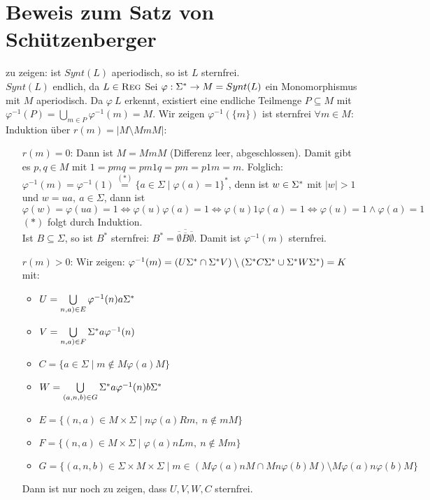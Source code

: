 \section{Beweis zum Satz von Schützenberger}
    zu zeigen: ist $Synt(L)$ aperiodisch, so ist $L$ sternfrei.\\
    $Synt(L)$ endlich, da $L\in \textsc{Reg}$
    Sei $\varphi:\Sigma^*\rightarrow M=Synt(L)$ ein Monomorphismus mit $M$ aperiodisch. Da $\varphi\ L$ erkennt, existiert eine endliche Teilmenge $P\subseteq M$ mit $\varphi^{-1}(P)=\bigcup\limits_{m\in P}\varphi^{-1}(m)=M$. Wir zeigen $\varphi^{-1}(\{m\})$ ist sternfrei $\forall m\in M$:\\
    Induktion über $r(m)=|M\setminus MmM|$:
    \begin{itemize}
        \item[$r(m)=0$:] Dann ist $M=MmM$ (Differenz leer, abgeschlossen). Damit gibt es $p,q\in M$ mit $1=pmq=pm1q=pm=p1m=m$. Folglich: $\varphi^{-1}(m)=\varphi^{-1}(1)\overset{(*)}{=}\{a\in\Sigma\mid\varphi(a)=1\}^*$, denn ist $w\in \Sigma^*$ mit $|w|>1$ und $w=ua,\ a\in \Sigma$, dann ist $$\varphi(w)=\varphi(ua)=1\Leftrightarrow \varphi(u)\varphi(a)=1\Leftrightarrow \varphi(u)1\varphi(a)=1\Leftrightarrow \varphi(u)=1\wedge \varphi(a)=1$$
        $(*)$ folgt durch Induktion.\\
        Ist $B\subseteq \Sigma$, so ist $B^*$ sternfrei: $B^*=\overline{\overline{\emptyset}\overline{B}\overline{\emptyset}}$. Damit ist $\varphi^{-1}(m)$ sternfrei.
        \item[$r(m)>0$:] Wir zeigen: $\varphi^{-1}(m)=(U\Sigma^*\cap \Sigma^* V)\setminus(\Sigma^* C\Sigma^*\cup \Sigma^* W\Sigma^*)=K$ mit:
        \begin{itemize}
            \item $U=\bigcup\limits_{n,a)\in E} \varphi^{-1}(n)a\Sigma^*$
            \item $V=\bigcup\limits_{n,a)\in F} \Sigma^* a\varphi^{-1}(n)$
            \item $C=\{a\in\Sigma\mid m\not\in M\varphi(a)M\}$
            \item $W=\bigcup\limits_{(a,n,b)\in G}\Sigma^* a\varphi^{-1}(n)b\Sigma^*$
            \item $E=\{(n,a)\in M\times \Sigma\mid n\varphi(a)Rm,\ n\not\in mM\}$
            \item $F=\{(n,a)\in M\times \Sigma\mid \varphi(a)nLm,\ n\not\in Mm\}$
            \item $G=\{(a,n,b)\in \Sigma\times M\times \Sigma\mid m\in \left(M\varphi(a)nM\cap Mn\varphi(b)M\right)\setminus M\varphi(a)n\varphi(b)M\}$
        \end{itemize}
        Dann ist nur noch zu zeigen, dass $U,V,W,C$ sternfrei.
    \end{itemize}
